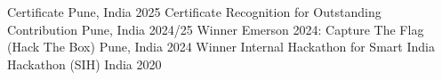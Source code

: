 


\begin{cvhonors}

  \cvhonor
    {Certificate} %
    {} %
    {Pune, India} %
    {2025} %
  \cvhonor
    {Certificate} %
    {Recognition for Outstanding Contribution} %
    {Pune, India} %
    {2024/25} %
  \cvhonor
    {Winner} %
    {Emerson 2024: Capture The Flag (Hack The Box)} %
    {Pune, India} %
    {2024} %
  \cvhonor
    {Winner} %
    {Internal Hackathon for Smart India Hackathon (SIH)} %
    {India} %
    {2020} %
\end{cvhonors}